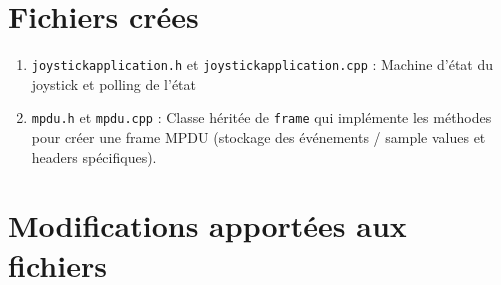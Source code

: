 \documentclass[DeseNET_Sebastien_Deriaz]{subfiles}
\begin{document}
\section{Fichiers crées}
\begin{enumerate}
\item \verb!joystickapplication.h! et \verb!joystickapplication.cpp! : Machine d'état du joystick et polling de l'état
\item \verb!mpdu.h! et \verb!mpdu.cpp! : Classe héritée de \verb!frame! qui implémente les méthodes pour créer une frame MPDU (stockage des événements / sample values et headers spécifiques).
\end{enumerate}


\section{Modifications apportées aux fichiers}


\end{document}
